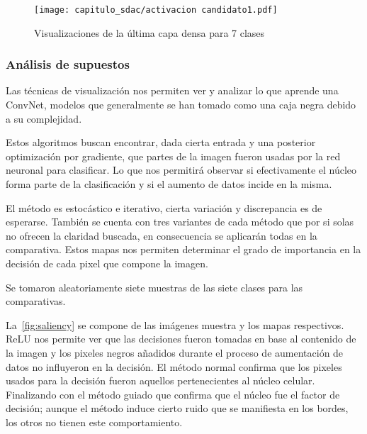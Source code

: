 \begin{figure}[H]
    \centering
    \texttt{[image: capitulo\_sdac/activacion candidato1.pdf]}
    \caption{Visualizaciones de la última capa densa para 7 clases}\label{fig:densa}
\end{figure}

\subsubsection{Análisis de supuestos}

Las técnicas de visualización nos permiten ver y analizar lo que aprende una
ConvNet, modelos que generalmente se han tomado como una caja negra debido a su
complejidad.

Estos algoritmos buscan encontrar, dada cierta entrada y una posterior
optimización por gradiente, que partes de la imagen fueron usadas por la red
neuronal para clasificar. Lo que nos permitirá observar si efectivamente el
núcleo forma parte de la clasificación y si el aumento de datos incide en la
misma.

El método es estocástico e iterativo, cierta variación y discrepancia es de
esperarse. También se cuenta con tres variantes de cada método que por si solas
no ofrecen la claridad buscada, en consecuencia se aplicarán todas en la
comparativa. Estos mapas nos permiten determinar el grado de importancia en la
decisión de cada pixel que compone la imagen.

Se tomaron aleatoriamente siete muestras de las siete clases para las
comparativas.

La~\autoref{fig:saliency} se compone de las imágenes muestra y los mapas
respectivos. ReLU nos permite ver que las decisiones fueron tomadas en base al
contenido de la imagen y los pixeles negros añadidos durante el proceso de
aumentación de datos no influyeron en la decisión. El método normal confirma que
los pixeles usados para la decisión fueron aquellos pertenecientes al núcleo
celular. Finalizando con el método guiado que confirma que el núcleo fue el
factor de decisión; aunque el método induce cierto ruido que se manifiesta en
los bordes, los otros no tienen este comportamiento.

